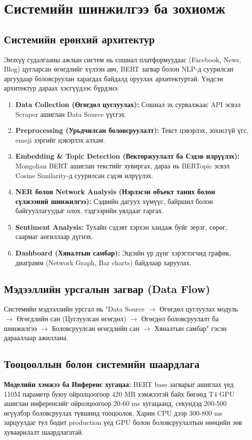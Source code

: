 \chapter{Системийн шинжилгээ ба зохиомж}
\section{Системийн ерөнхий архитектур}
Энэхүү судалгааны ажлын систем нь сошиал платформуудаас (Facebook, News, Blog) цугларсан өгөгдлийг хүлээн авч, BERT загвар болон NLP-д суурилсан аргуудаар боловсруулан харагдах байдалд оруулах архитектуртай. Үндсэн архитектур дараах хэсгүүдээс бүрдэнэ:
\begin{enumerate}
    \item \textbf{Data Collection (Өгөгдөл цуглуулах):} Сошиал эх сурвалжаас API эсвэл Scraper ашиглан Data Source үүсгэх.
    \item \textbf{Preprocessing (Урьдчилсан боловсруулалт):} Текст цэвэрлэх, зохисгүй үгс, emoji зэргийг цэвэрлэх алхам.
    \item \textbf{Embedding \& Topic Detection (Векторжуулалт ба Сэдэв илрүүлэх):} Mongolian BERT ашиглан текстийг хувиргах, дараа нь BERTopic эсвэл Cosine Similarity-д суурилсан сэдэв илрүүлэх.
    \item \textbf{NER болон Network Analysis (Нэрлэсэн объект таних болон сүлжээний шинжилгээ):} Сэдвийн дагуух хүмүүс, байршил болон байгууллагуудыг олох, тэдгээрийн уялдааг гаргах.
    \item \textbf{Sentiment Analysis:} Тухайн сэдэвт хэрхэн хандаж буйг эерэг, сөрөг, саармаг ангиллаар дүгнэх.
    \item \textbf{Dashboard (Хяналтын самбар):} Эцсийн үр дүнг хэрэглэгчид график, диаграмм (Network Graph, Bar charts) байдлаар харуулах.
\end{enumerate}

\section{Мэдээллийн урсгалын загвар (Data Flow)}
Системийн мэдээллийн урсгал нь "Data Source $\rightarrow$ Өгөгдөл цуглуулах модуль $\rightarrow$ Өгөгдлийн сан (Цуглуулсан өгөгдөл) $\rightarrow$ Өгөгдөл боловсруулалт ба шинжилгээ $\rightarrow$ Боловсруулсан өгөгдлийн сан $\rightarrow$ Хяналтын самбар" гэсэн дарааллаар ажиллана. 

\section{Тооцооллын болон системийн шаардлага}
\textbf{Моделийн хэмжээ ба Инференс хугацаа:} BERT base загварыг ашиглах үед 110M параметр буюу ойролцоогоор 420 MB хэмжээтэй байх бөгөөд T4 GPU ашиглан инференсийг ойролцоогоор 20-60 ms хугацаанд, секундэд 200-500 өгүүлбэр боловсруулах түвшинд тооцоолов. Харин CPU дээр 300-800 ms зарцуулдаг тул бодит production үед GPU болон боловсруулалтын нөөцийн зөв хуваарилалт шаардлагатай.

